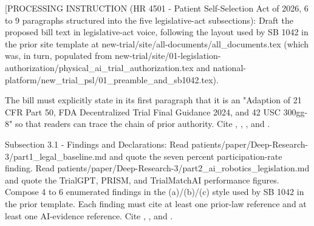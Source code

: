 %

[PROCESSING INSTRUCTION (HR 4501 - Patient Self-Selection Act of 2026,
6 to 9 paragraphs structured into the five legislative-act
subsections): Draft the proposed bill text in legislative-act voice,
following the layout used by SB 1042 in the prior site template at
new-trial/site/all-documents/all\_documents.tex (which was, in turn,
populated from new-trial/site/01-legislation-authorization/physical\_ai\_trial\_authorization.tex
and national-platform/new\_trial\_psl/01\_preamble\_and\_sb1042.tex).

The bill must explicitly state in its first paragraph that it is an
"Adaption of 21 CFR Part 50, FDA Decentralized Trial Final Guidance
2024, and 42 USC 300gg-8" so that readers can trace the chain of prior
authority. Cite \cite{hhs_45cfr46_protection_human_subjects},
\cite{fda_dct_guidance_2024}, \cite{fda_oce_advancing_oncology_dct_2024},
and \cite{usc_300gg8_clinical_trials}.

Subsection 3.1 - Findings and Declarations: Read
patients/paper/Deep-Research-3/part1\_legal\_baseline.md and quote the
seven percent participation-rate finding. Read
patients/paper/Deep-Research-3/part2\_ai\_robotics\_legislation.md and
quote the TrialGPT, PRISM, and TrialMatchAI performance figures.
Compose 4 to 6 enumerated findings in the (a)/(b)/(c) style used by
SB 1042 in the prior template. Each finding must cite at least one
prior-law reference and at least one AI-evidence reference. Cite
\cite{jin2024trialgpt}, \cite{gupta2024prism}, and
\cite{abdallah2026trialmatchai}.

